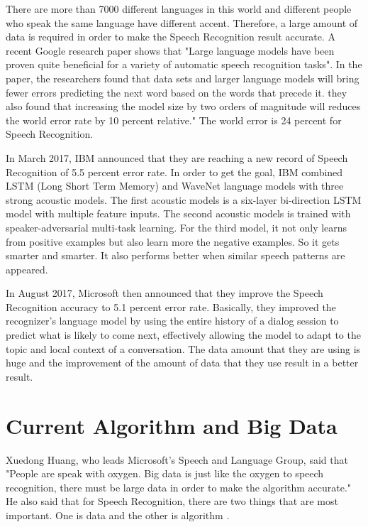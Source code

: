\documentclass[sigconf]{acmart}
\begin{document}
There are more than 7000 different languages in this world and different people who speak the same language have different accent. Therefore, a large amount of data is required in order to make the Speech Recognition result accurate. A recent Google research paper shows that "Large language models have been proven quite beneficial for a variety of automatic speech recognition tasks"\cite{40491}. In the paper, the researchers found that data sets and larger language models will bring fewer errors predicting the next word based on the words that precede it. they also found that increasing the model size by two orders of magnitude will reduces the world error rate by 10 percent relative." The world error is 24 percent for Speech Recognition.

In March 2017, IBM announced that they are reaching a new record of Speech Recognition of 5.5 percent error rate. In order to get the goal, IBM  combined LSTM (Long Short Term Memory) and WaveNet language models with three strong acoustic models\cite{ibm}. The first acoustic models is a six-layer bi-direction LSTM model with multiple feature inputs. The second acoustic models is trained with speaker-adversarial multi-task learning. For the third model, it not only learns from positive examples but also learn more the negative examples. So it gets smarter and smarter. It also performs better when similar speech patterns are appeared.

In August 2017, Microsoft then announced that they improve the Speech Recognition accuracy to 5.1 percent error rate. Basically, they improved the recognizer's language model by using the entire history of a dialog session to predict what is likely to come next, effectively allowing the model to adapt to the topic and local context of a conversation\cite{microsoft}. The data amount that they are using is huge and the improvement of the amount of data that they use result in a better result. 

\section{Current Algorithm and Big Data}
Xuedong Huang, who leads Microsoft's Speech and Language Group, said that "People are speak with oxygen. Big data is just like the oxygen to speech recognition, there must be large data in order to make the algorithm accurate." He also said that for Speech Recognition, there are two things that are most important. One is data and the other is algorithm\cite{hxd} .
\end{document}
